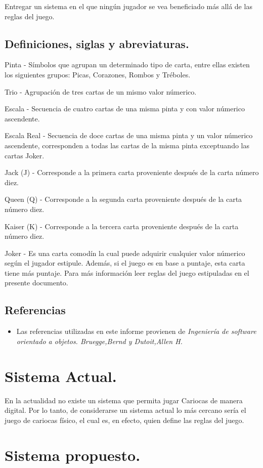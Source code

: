 \documentclass[60pt]{article}
\begin{document}
Entregar un sistema en el que ningún jugador se vea beneficiado más allá de las reglas del juego.
\subsection{Definiciones, siglas y abreviaturas.}\label{cap:definiciones}
Pinta - Símbolos que agrupan un determinado tipo de carta, entre ellas existen los siguientes grupos: Picas, Corazones, Rombos y Tréboles.

Trio - Agrupación de tres cartas de un mismo valor númerico.

Escala - Secuencia de cuatro cartas de una misma pinta y con valor númerico ascendente.

Escala Real - Secuencia de doce cartas de una misma pinta y un valor númerico ascendente, corresponden a todas las cartas de la misma pinta exceptuando las cartas Joker.

Jack (J) - Corresponde a la primera carta proveniente después de la carta número diez.

Queen (Q) - Corresponde a la segunda carta proveniente después de la carta número diez.

Kaiser (K) - Corresponde a la tercera carta proveniente después de la carta número diez.

Joker - Es una carta comodín la cual puede adquirir cualquier valor númerico según el jugador estipule. Además, si el juego es en base a puntaje, esta carta tiene más puntaje. Para más información leer reglas del juego estipuladas en el presente documento.
\subsection{Referencias}
\begin{itemize}
    \item Las referencias utilizadas en este informe provienen de \textit{Ingeniería de software orientado a objetos. Bruegge,Bernd y Dutoit,Allen H.} \cite{oop}
\end{itemize}
\section{Sistema Actual.}\label{cap:sistemaActual}
En la actualidad no existe un sistema que permita jugar Cariocas de manera digital. Por lo tanto, de considerarse un sistema actual lo más cercano sería el juego de cariocas físico, el cual es, en efecto, quien define las reglas del juego.
\section{Sistema propuesto.}\label{cap:sistema}
\end{document}
